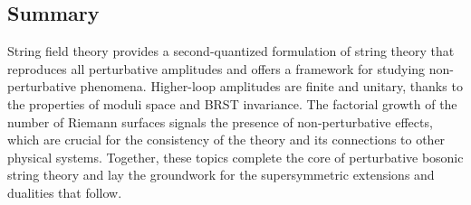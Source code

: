 \documentclass[11pt]{article}
\begin{document}
\subsection{Summary}

String field theory provides a second-quantized formulation of string theory that reproduces all perturbative amplitudes and offers a framework for studying non-perturbative phenomena. Higher-loop amplitudes are finite and unitary, thanks to the properties of moduli space and BRST invariance. The factorial growth of the number of Riemann surfaces signals the presence of non-perturbative effects, which are crucial for the consistency of the theory and its connections to other physical systems. Together, these topics complete the core of perturbative bosonic string theory and lay the groundwork for the supersymmetric extensions and dualities that follow.
\end{document}
